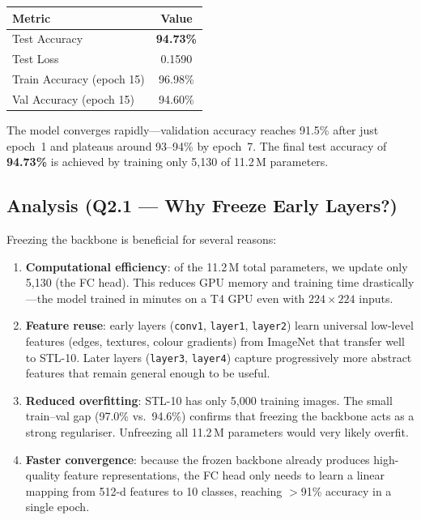 \documentclass[11pt,a4paper]{article}
\begin{document}
\begin{center}
\begin{tabular}{lc}
\toprule
\textbf{Metric} & \textbf{Value} \\
\midrule
Test Accuracy              & \textbf{94.73\%} \\
Test Loss                  & 0.1590 \\
Train Accuracy (epoch 15)  & 96.98\% \\
Val Accuracy (epoch 15)    & 94.60\% \\
\bottomrule
\end{tabular}
\end{center}

The model converges rapidly---validation accuracy reaches 91.5\% after just
epoch~1 and plateaus around 93--94\% by epoch~7. The final test accuracy of
\textbf{94.73\%} is achieved by training only 5{,}130 of 11.2\,M parameters.

\subsection{Analysis (Q2.1 --- Why Freeze Early Layers?)}

Freezing the backbone is beneficial for several reasons:
\begin{enumerate}
  \item \textbf{Computational efficiency}: of the 11.2\,M total parameters,
        we update only 5{,}130 (the FC head). This reduces GPU memory and
        training time drastically---the model trained in minutes on a T4 GPU
        even with $224\times224$ inputs.
  \item \textbf{Feature reuse}: early layers (\texttt{conv1}, \texttt{layer1},
        \texttt{layer2}) learn universal low-level features (edges, textures,
        colour gradients) from ImageNet that transfer well to STL-10. Later
        layers (\texttt{layer3}, \texttt{layer4}) capture progressively more
        abstract features that remain general enough to be useful.
  \item \textbf{Reduced overfitting}: STL-10 has only 5{,}000 training images.
        The small train--val gap (97.0\% vs.\ 94.6\%) confirms that freezing
        the backbone acts as a strong regulariser. Unfreezing all 11.2\,M
        parameters would very likely overfit.
  \item \textbf{Faster convergence}: because the frozen backbone already produces
        high-quality feature representations, the FC head only needs to learn a
        linear mapping from 512-d features to 10 classes, reaching $>$91\%
        accuracy in a single epoch.
\end{enumerate}
\end{document}
